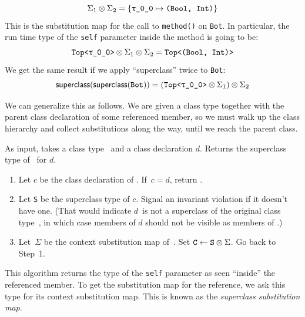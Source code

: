 \documentclass[../generics]{subfiles}
\begin{document}
\begin{example}
\[
\Sigma_1 \otimes \Sigma_2 = \SubstMap{\SubstType{\rT}{(Bool, Int)}}
\]
This is the substitution map for the call to \texttt{method()} on \texttt{Bot}. In particular, the run time type of the \texttt{self} parameter inside the method is going to be:
\[
\texttt{Top<\rT>} \otimes \Sigma_1 \otimes \Sigma_2 = \texttt{Top<(Bool, Int)>}
\]
We get the same result if we apply ``\textsf{superclass}'' twice to \texttt{Bot}:
\[
\mathsf{superclass}(\mathsf{superclass}(\texttt{Bot})) = (\texttt{Top<\rT>} \otimes \Sigma_1) \otimes \Sigma_2
\]
\end{example}

We can generalize this as follows. We are given a class type together with the parent class declaration of some referenced member, so we must walk up the class hierarchy and collect substitutions along the way, until we reach the parent class.

\begin{algorithm}\label{superclassfordecl} As input, takes a class type \tC\ and a class declaration $d$. Returns the superclass type of \tC\ for $d$.
\begin{enumerate}
\item Let $c$ be the class declaration of \tC. If~$c=d$, return \tC.
\item Let \texttt{S} be the superclass type of $c$. Signal an invariant violation if it doesn't have one. (That would indicate $d$~is not a superclass of the original class type~\tC, in which case members of $d$ should not be visible as members of \tC.)
\item Let~$\Sigma$ be the context substitution map of~\tC. Set $\texttt{C} \leftarrow \texttt{S} \otimes \Sigma$. Go back to Step~1.
\end{enumerate}
\end{algorithm}

This algorithm returns the type of the \texttt{self} parameter as seen ``inside'' the referenced member. To get the substitution map for the reference, we ask this type for its context substitution map. This is known as the \emph{superclass substitution map}.
\end{document}
